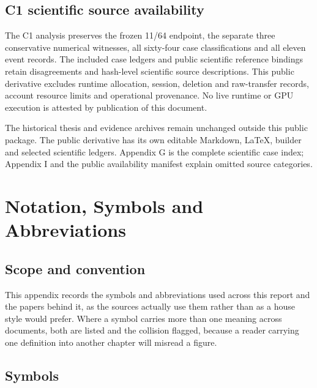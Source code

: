 \documentclass[12pt,a4paper]{report}
\begin{document}
\section{C1 scientific source
availability}\label{c1-scientific-source-availability}

The C1 analysis preserves the frozen 11/64 endpoint, the separate three
conservative numerical witnesses, all sixty-four case classifications
and all eleven event records. The included case ledgers and public
scientific reference bindings retain disagreements and hash-level
scientific source descriptions. This public derivative excludes runtime
allocation, session, deletion and raw-transfer records, account resource
limits and operational provenance. No live runtime or GPU execution is
attested by publication of this document.

The historical thesis and evidence archives remain unchanged outside
this public package. The public derivative has its own editable
Markdown, LaTeX, builder and selected scientific ledgers. Appendix G is
the complete scientific case index; Appendix I and the public
availability manifest explain omitted source categories.



\chapter{Notation, Symbols and
Abbreviations}\label{notation-symbols-and-abbreviations}

\section{Scope and convention}\label{scope-and-convention}

This appendix records the symbols and abbreviations used across this
report and the papers behind it, as the sources actually use them rather
than as a house style would prefer. Where a symbol carries more than one
meaning across documents, both are listed and the collision flagged,
because a reader carrying one definition into another chapter will
misread a figure.

\section{Symbols}\label{symbols}
\end{document}
